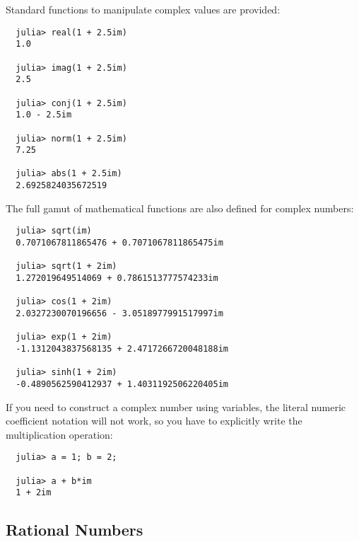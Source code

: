 \documentclass{article}
\begin{document}
Standard functions to manipulate complex values are provided:
\begin{verbatim}
  julia> real(1 + 2.5im)
  1.0

  julia> imag(1 + 2.5im)
  2.5

  julia> conj(1 + 2.5im)
  1.0 - 2.5im

  julia> norm(1 + 2.5im)
  7.25

  julia> abs(1 + 2.5im)
  2.6925824035672519
\end{verbatim}
The full gamut of mathematical functions are also defined for complex numbers:
\begin{verbatim}
  julia> sqrt(im)
  0.7071067811865476 + 0.7071067811865475im

  julia> sqrt(1 + 2im)
  1.272019649514069 + 0.7861513777574233im

  julia> cos(1 + 2im)
  2.0327230070196656 - 3.0518977991517997im

  julia> exp(1 + 2im)
  -1.1312043837568135 + 2.4717266720048188im

  julia> sinh(1 + 2im)
  -0.4890562590412937 + 1.4031192506220405im
\end{verbatim}

If you need to construct a complex number using variables, the literal numeric coefficient notation will not work, so you have to explicitly write the multiplication operation:
\begin{verbatim}
  julia> a = 1; b = 2;

  julia> a + b*im
  1 + 2im
\end{verbatim}

\subsection{Rational Numbers}
\end{document}
